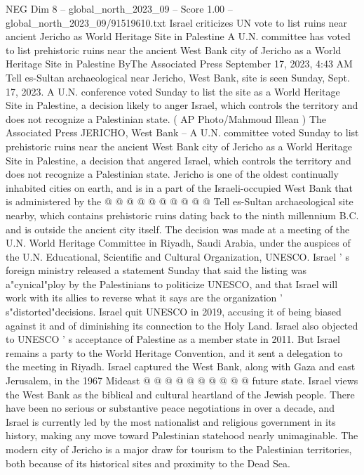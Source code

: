 \begin{textsample}{NEG Dim 8 – global\_north\_2023\_09 – Score 1.00 – global\_north\_2023\_09/91519610.txt}  \label{ex:f8_neg_324}
Israel criticizes UN vote to list ruins near ancient Jericho as World Heritage Site in Palestine A U.N. committee has voted to list prehistoric ruins near the ancient West Bank city of Jericho as a World Heritage Site in Palestine ByThe Associated Press September 17, 2023, 4:43 AM Tell es-Sultan archaeological near Jericho, West Bank, site is seen Sunday, Sept. 17, 2023.
A U.N. conference voted Sunday to list the site as a World Heritage Site in Palestine, a decision likely to anger Israel, which controls the territory and does not recognize a Palestinian state. ( AP Photo/Mahmoud Illean ) The Associated Press JERICHO, West Bank -- A U.N. committee voted Sunday to list prehistoric ruins near the ancient West Bank city of Jericho as a World Heritage Site in Palestine, a decision that angered Israel, which controls the territory and does not recognize a Palestinian state.
Jericho is one of the oldest continually inhabited cities on earth, and is in a part of the Israeli-occupied West Bank that is administered by the @ @ @ @ @ @ @ @ @ @ Tell es-Sultan archaeological site nearby, which contains prehistoric ruins dating back to the ninth millennium B.C. and is outside the ancient city itself.
The decision was made at a meeting of the U.N.
World Heritage Committee in Riyadh, Saudi Arabia, under the auspices of the U.N.
Educational, Scientific and Cultural Organization, UNESCO.
Israel ' s foreign ministry released a statement Sunday that said the listing was a"cynical"ploy by the Palestinians to politicize UNESCO, and that Israel will work with its allies to reverse what it says are the organization ' s"distorted"decisions.
Israel quit UNESCO in 2019, accusing it of being biased against it and of diminishing its connection to the Holy Land.
Israel also objected to UNESCO ' s acceptance of Palestine as a member state in 2011.
But Israel remains a party to the World Heritage Convention, and it sent a delegation to the meeting in Riyadh.
Israel captured the West Bank, along with Gaza and east Jerusalem, in the 1967 Mideast @ @ @ @ @ @ @ @ @ @ future state.
Israel views the West Bank as the biblical and cultural heartland of the Jewish people.
There have been no serious or substantive peace negotiations in over a decade, and Israel is currently led by the most nationalist and religious government in its history, making any move toward Palestinian statehood nearly unimaginable.
The modern city of Jericho is a major draw for tourism to the Palestinian territories, both because of its historical sites and proximity to the Dead Sea.

\end{textsample}
